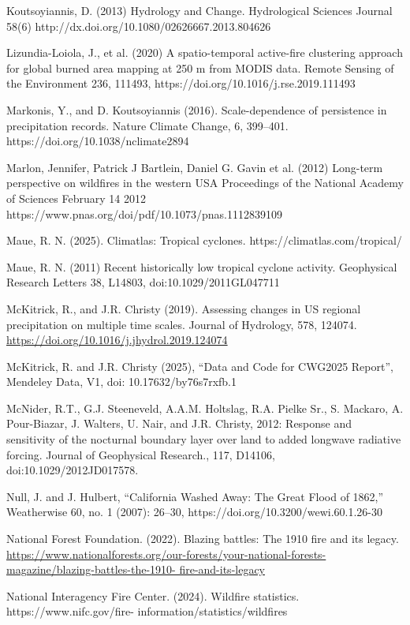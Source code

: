 \documentclass[12pt,paper=a4,DIV=12,parskip=never,chapterprefix=false,headings=standardclasses]{scrreprt}
\begin{document}
Koutsoyiannis, D. (2013) Hydrology and Change. Hydrological Sciences Journal 58(6)
http://dx.doi.org/10.1080/02626667.2013.804626

Lizundia-Loiola, J., et al. (2020) A spatio-temporal active-fire clustering approach for global burned area
mapping at 250 m from MODIS data. Remote Sensing of the Environment 236, 111493,
https://doi.org/10.1016/j.rse.2019.111493

Markonis, Y., and D. Koutsoyiannis (2016). Scale-dependence of persistence in precipitation records.
Nature Climate Change, 6, 399–401. https://doi.org/10.1038/nclimate2894

Marlon, Jennifer, Patrick J Bartlein, Daniel G. Gavin et al. (2012) Long-term perspective on wildfires in
the western USA Proceedings of the National Academy of Sciences February 14 2012
https://www.pnas.org/doi/pdf/10.1073/pnas.1112839109

Maue, R. N. (2025). Climatlas: Tropical cyclones. https://climatlas.com/tropical/

Maue, R. N. (2011) Recent historically low tropical cyclone activity. Geophysical Research Letters 38,
L14803, doi:10.1029/2011GL047711

McKitrick, R., and J.R. Christy (2019). Assessing changes in US regional precipitation on multiple time
scales. Journal of Hydrology, 578, 124074. \url{https://doi.org/10.1016/j.jhydrol.2019.124074}

McKitrick, R. and J.R. Christy (2025), “Data and Code for CWG2025 Report”, Mendeley Data, V1, doi:
10.17632/by76s7rxfb.1

McNider, R.T., G.J. Steeneveld, A.A.M. Holtslag, R.A. Pielke Sr., S. Mackaro, A. Pour-Biazar, J.
Walters, U. Nair, and J.R. Christy, 2012: Response and sensitivity of the nocturnal boundary layer
over land to added longwave radiative forcing. Journal of Geophysical Research., 117, D14106,
doi:10.1029/2012JD017578.

Null, J. and J. Hulbert, “California Washed Away: The Great Flood of 1862,” Weatherwise 60, no. 1
(2007): 26–30, https://doi.org/10.3200/wewi.60.1.26-30

National Forest Foundation. (2022). Blazing battles: The 1910 fire and its legacy.
\url{https://www.nationalforests.org/our-forests/your-national-forests-magazine/blazing-battles-the-1910-
fire-and-its-legacy}

National Interagency Fire Center. (2024). Wildfire statistics. https://www.nifc.gov/fire-
information/statistics/wildfires
\end{document}
